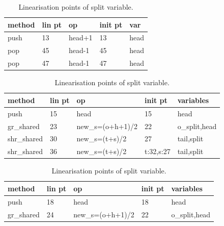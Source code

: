 \documentclass{sig-alternate-br}
\begin{document}
\begin{table}[h]
	\begin{subtable}[h]{0.45\textwidth}
		\centering
		\begin{tabular}{|l|l|l|l|l|}
			\hline
			\textbf{method} & \textbf{lin pt} & \textbf{op} & \textbf{init pt} & \textbf{var} \\ \hline
			push            & 13                 & head+1      & 13                  & head               \\ \hline
			pop             & 45                 & head-1      & 45                  & head               \\ \hline
			pop             & 47                 & head-1      & 47                  & head               \\ \hline
		\end{tabular}
		\caption{Linearisation points of head variable.}
		\label{tab:head}
	\end{subtable}
	\hfill
	\begin{subtable}[h]{0.45\textwidth}
		\centering
		\begin{tabular}{|l|l|l|l|l|}
			\hline
			\textbf{method} & \textbf{lin pt} & \textbf{op} & \textbf{init pt} & \textbf{variables}  \\ \hline
			push            & 15                 & head        		   & 15        & head                \\ \hline
			gr\_shared    & 23                 & new\_s=(o+h+1)/2 & 22                  & o\_split,head \\ \hline
			shr\_shared  & 30                 & new\_s=(t+s)/2      & 27                  & tail,split             \\ \hline
			shr\_shared  & 36                 & new\_s=(t+s)/2      & t:32,s:27        & tail,split             \\ \hline
		\end{tabular}
		\caption{Linearisation points of split variable.}
		\label{tab:split}
	\end{subtable}
	\hfill
	\begin{subtable}[h]{0.45\textwidth}
		\centering
		\begin{tabular}{|l|l|l|l|l|}
			\hline
			\textbf{method} & \textbf{lin pt} & \textbf{op} & \textbf{init pt} & \textbf{variables}  \\ \hline
			push            & 18                 & head        & 18                  & head                \\ \hline
			gr\_shared    & 24                 & new\_s=(o+h+1)/2      & 22                  & o\_split,head \\ \hline

\end{tabular}
\end{subtable}
\end{table}
\end{document}
